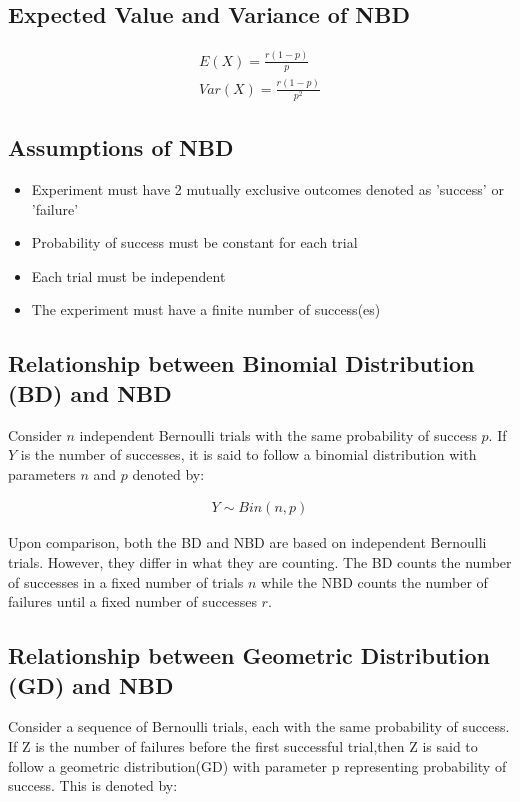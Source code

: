 \documentclass{article}
\begin{document}
\subsection{Expected Value and Variance of NBD}
\begin{gather*}
  E(X) = \frac{r(1-p)}{p} \\[5pt]
  Var(X) = \frac{r(1-p)}{p^2}
\end{gather*}

\subsection{Assumptions of NBD}
\begin{itemize}
  \item Experiment must have 2 mutually exclusive outcomes denoted as
    'success' or 'failure'
  \item Probability of success must be constant for each trial
  \item Each trial must be independent
  \item The experiment must have a finite number of success(es)
\end{itemize}

\subsection{Relationship between Binomial Distribution (BD) and NBD}
Consider $ n $ independent Bernoulli trials with the same probability 
of success $ p $. If $ Y $ is the number of successes, it is said
to follow a binomial distribution with parameters $ n $ and $ p $
denoted by:



\begin{gather*}
  Y \sim Bin(n, p)
\end{gather*}

Upon comparison, both the BD and NBD are based on independent 
Bernoulli trials. However, they differ in what they are counting.
The BD counts the number of successes in a fixed number of 
trials $ n $ while the NBD counts the number of failures until
a fixed number of successes $ r $.

\subsection{Relationship between Geometric Distribution (GD) and NBD}
Consider a sequence of Bernoulli trials, each with the same probability 
of success. If Z is the number of failures before the first successful 
trial,then Z is said to follow a geometric distribution(GD) with parameter 
p representing probability of success. This is denoted by:
\end{document}
